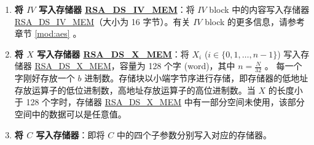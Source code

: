 \documentclass[main\_\_CN.tex]{subfiles}
\begin{document}
\begin{enumerate}
\begin{itemize}
        如果 \hyperref[regdesc:RSADSQUERYBUSYREG]{RSA\_DS\_QUERY\_BUSY\_REG} 超过 1 ms 还没读到 0，则说明 HMAC 初始化出现了问题。此时，软件应当读寄存器 \hyperref[regdesc:RSADSQUERYKEYWRONGREG]{RSA\_DS\_QUERY\_KEY\_WRONG\_REG}，根据返回值判断具体是下述哪一种情况：
        \begin{itemize}

            \item 如果读到零值，说明 HMAC 未被调用。

            \item 如果读到非零值 (1 \verb+~+ 15)，则说明 HMAC 被调用过，但是 RSA\_DS 外设没有成功从 HMAC 模块获取到 \begin{math}RSA\_DS\_KEY\end{math}。此种情况可能是因为受到了其他程序的干扰。

        \end{itemize}


    \end{itemize}

    \item {\bfseries 将 \begin{math}IV\end{math} 写入存储器 \hyperref[RSADSIVMEM]{RSA\_DS\_IV\_MEM}}：将 \begin{math}IV\end{math} block 中的内容写入存储器 \hyperref[RSADSIVMEM]{RSA\_DS\_IV\_MEM}（大小为 16 字节）。有关 \begin{math}IV\end{math} block 的更多信息，请参考章节 \ref{mod:aes} \textit{}。

    \item {\bfseries 将 \begin{math}X\end{math} 写入存储器 \hyperref[RSADSXMEM]{RSA\_DS\_X\_MEM}}：将 \begin{math}X_{i}\end{math}
        (\begin{math}i \in \{ 0, 1, \dots, n-1 \} \end{math})
        写入存储器 \hyperref[RSADSXMEM]{RSA\_DS\_X\_MEM}，容量为 128 个字 (word)，其中 \begin{math} n = \frac{N}{32} \end{math} 。
        每一个字刚好存放一个 \begin{math}b\end{math} 进制数。存储块以小端字节序进行存储，即存储器的低地址存放运算子的低位进制数，高地址存放运算子的高位进制数。当 \begin{math}X\end{math} 的长度小于 128 个字时，存储器 \hyperref[RSADSXMEM]{RSA\_DS\_X\_MEM} 中有一部分空间未使用，该部分空间中的数据可以是任意值。
    \item {\bfseries 将 \begin{math}C\end{math} 写入存储器}：即将 \begin{math}C\end{math} 中的四个子参数分别写入对应的存储器。
    \begin{itemize}


\end{itemize}
\end{enumerate}
\end{document}
